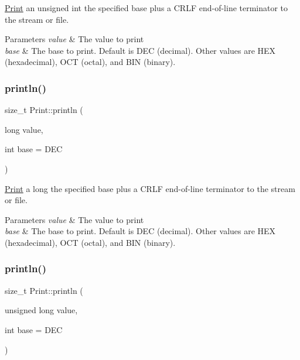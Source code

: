 \mbox{\hyperlink{class_print}{Print}} an unsigned int the specified base plus a C\+R\+LF end-\/of-\/line terminator to the stream or file. 


\begin{DoxyParams}{Parameters}
{\em value} & The value to print \\
\hline
{\em base} & The base to print. Default is D\+EC (decimal). Other values are H\+EX (hexadecimal), O\+CT (octal), and B\+IN (binary). \\
\hline
\end{DoxyParams}
\mbox{\label{class_print_a82bbe59b28440c29e55ff3597eb45376}} 
\subsubsection{\texorpdfstring{println()}{println()}\hspace{0.1cm}{\footnotesize\ttfamily [4/6]}}
{\footnotesize\ttfamily size\+\_\+t Print\+::println (\begin{DoxyParamCaption}\item[{long}]{value,  }\item[{int}]{base = {\ttfamily DEC} }\end{DoxyParamCaption})}



\mbox{\hyperlink{class_print}{Print}} a long the specified base plus a C\+R\+LF end-\/of-\/line terminator to the stream or file. 


\begin{DoxyParams}{Parameters}
{\em value} & The value to print \\
\hline
{\em base} & The base to print. Default is D\+EC (decimal). Other values are H\+EX (hexadecimal), O\+CT (octal), and B\+IN (binary). \\
\hline
\end{DoxyParams}
\mbox{\label{class_print_afa936d7e8dd329d9162f2cd28f42681e}} 
\subsubsection{\texorpdfstring{println()}{println()}\hspace{0.1cm}{\footnotesize\ttfamily [5/6]}}
{\footnotesize\ttfamily size\+\_\+t Print\+::println (\begin{DoxyParamCaption}\item[{unsigned long}]{value,  }\item[{int}]{base = {\ttfamily DEC} }\end{DoxyParamCaption})}




